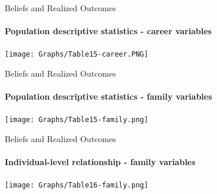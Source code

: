 \documentclass[12pt]{beamer}
\begin{document}
\begin{frame}{Beliefs and Realized Outcomes}
    \framesubtitle{Population descriptive statistics - career variables}
    \texttt{[image: Graphs/Table15-career.PNG]}
\end{frame}

\begin{frame}{Beliefs and Realized Outcomes}
    \framesubtitle{Population descriptive statistics - family variables}
    \texttt{[image: Graphs/Table15-family.png]}
\end{frame}

\begin{frame}{Beliefs and Realized Outcomes}
    \framesubtitle{Individual-level relationship - family variables}
    \texttt{[image: Graphs/Table16-family.png]}
\end{frame}
\end{document}
